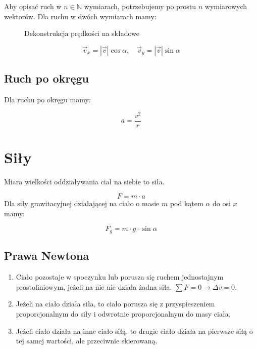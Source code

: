 \documentclass{../notatki}
\begin{document}
Aby opisać ruch w $n \in \mathbb{N}$ wymiarach, potrzebujemy po prostu $n$
wymiarowych wektorów. Dla ruchu w dwóch wymiarach mamy:

\begin{figure*}[ht]
  \centering
  \caption{Dekonstrukcja prędkości na składowe}
\end{figure*}

$$
\vec{v}_x = |\vec{v}| \cos \alpha, \quad \vec{v}_y = |\vec{v}| \sin \alpha
$$

\subsection{Ruch po okręgu}

Dla ruchu po okręgu mamy:

$$
a = \frac{v^2}{r}
$$

\section{Siły}

Miara wielkości oddziaływania ciał na siebie to siła.

$$
F = m \cdot a
$$
Dla siły grawitacyjnej działającej na ciało o masie $m$ pod kątem
$\alpha$ do osi $x$ mamy:

$$
F_g = m \cdot g \cdot \sin \alpha
$$

\subsection{Prawa Newtona}

\begin{enumerate}
  \item Ciało pozostaje w spoczynku lub porusza się ruchem jednostajnym
    prostoliniowym, jeżeli na nie nie działa żadna siła. $\sum F = 0
    \rightarrow \Delta v = 0$.
  \item Jeżeli na ciało działa siła, to ciało porusza się z przyspieszeniem
    proporcjonalnym do siły i odwrotnie proporcjonalnym do masy ciała.
  \item Jeżeli ciało działa na inne ciało siłą, to drugie ciało działa na
    pierwsze siłą o tej samej wartości, ale przeciwnie skierowaną.
\end{enumerate}
\end{document}
